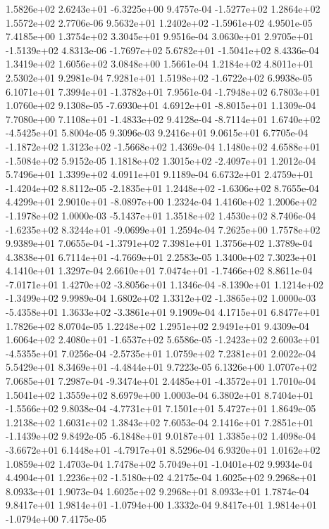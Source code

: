  1.5826e+02  2.6243e+01 -6.3225e+00  9.4757e-04
-1.5277e+02  1.2864e+02  1.5572e+02  2.7706e-06
 9.5632e+01  1.2402e+02 -1.5961e+02  4.9501e-05
7.4185e+00 1.3754e+02 3.3045e+01  9.9516e-04
 3.0630e+01  2.9705e+01 -1.5139e+02  4.8313e-06
-1.7697e+02  5.6782e+01 -1.5041e+02  8.4336e-04
1.3419e+02 1.6056e+02 3.0848e+00  1.5661e-04
1.2184e+02 4.8011e+01 2.5302e+01  9.2981e-04
 7.9281e+01  1.5198e+02 -1.6722e+02  6.9938e-05
 6.1071e+01  7.3994e+01 -1.3782e+01  7.9561e-04
-1.7948e+02  6.7803e+01  1.0760e+02  9.1308e-05
-7.6930e+01  4.6912e+01 -8.8015e+01  1.1309e-04
 7.7080e+00  7.1108e+01 -1.4833e+02  9.4128e-04
-8.7114e+01  1.6740e+02 -4.5425e+01  5.8004e-05
9.3096e-03 9.2416e+01 9.0615e+01  6.7705e-04
-1.1872e+02  1.3123e+02 -1.5668e+02  1.4369e-04
 1.1480e+02  4.6588e+01 -1.5084e+02  5.9152e-05
 1.1818e+02  1.3015e+02 -2.4097e+01  1.2012e-04
5.7496e+01 1.3399e+02 4.0911e+01  9.1189e-04
 6.6732e+01  2.4759e+01 -1.4204e+02  8.8112e-05
-2.1835e+01  1.2448e+02 -1.6306e+02  8.7655e-04
 4.4299e+01  2.9010e+01 -8.0897e+00  1.2324e-04
 1.4160e+02  1.2006e+02 -1.1978e+02  1.0000e-03
-5.1437e+01  1.3518e+02  1.4530e+02  8.7406e-04
-1.6235e+02  8.3244e+01 -9.0699e+01  1.2594e-04
7.2625e+00 1.7578e+02 9.9389e+01  7.0655e-04
-1.3791e+02  7.3981e+01  1.3756e+02  1.3789e-04
 4.3838e+01  6.7114e+01 -4.7669e+01  2.2583e-05
1.3400e+02 7.3023e+01 4.1410e+01  1.3297e-04
 2.6610e+01  7.0474e+01 -1.7466e+02  8.8611e-04
-7.0171e+01  1.4270e+02 -3.8056e+01  1.1346e-04
-8.1390e+01  1.1214e+02 -1.3499e+02  9.9989e-04
 1.6802e+02  1.3312e+02 -1.3865e+02  1.0000e-03
-5.4358e+01  1.3633e+02 -3.3861e+01  9.1909e-04
4.1715e+01 6.8477e+01 1.7826e+02  8.0704e-05
1.2248e+02 1.2951e+02 2.9491e+01  9.4309e-04
 1.6064e+02  2.4080e+01 -1.6537e+02  5.6586e-05
-1.2423e+02  2.6003e+01 -4.5355e+01  7.0256e-04
-2.5735e+01  1.0759e+02  7.2381e+01  2.0022e-04
 5.5429e+01  8.3469e+01 -4.4844e+01  9.7223e-05
6.1326e+00 1.0707e+02 7.0685e+01  7.2987e-04
-9.3474e+01  2.4485e+01 -4.3572e+01  1.7010e-04
1.5041e+02 1.3559e+02 8.6979e+00  1.0003e-04
 6.3802e+01  8.7404e+01 -1.5566e+02  9.8038e-04
-4.7731e+01  7.1501e+01  5.4727e+01  1.8649e-05
1.2138e+02 1.6031e+02 1.3843e+02  7.6053e-04
 2.1416e+01  7.2851e+01 -1.1439e+02  9.8492e-05
-6.1848e+01  9.0187e+01  1.3385e+02  1.4098e-04
-3.6672e+01  6.1448e+01 -4.7917e+01  8.5296e-04
6.9320e+01 1.0162e+02 1.0859e+02  1.4703e-04
 1.7478e+02  5.7049e+01 -1.0401e+02  9.9934e-04
 4.4904e+01  1.2236e+02 -1.5180e+02  4.2175e-04
1.6025e+02 9.2968e+01 8.0933e+01  1.9073e-04
1.6025e+02 9.2968e+01 8.0933e+01  1.7874e-04
 9.8417e+01  1.9814e+01 -1.0794e+00  1.3332e-04
 9.8417e+01  1.9814e+01 -1.0794e+00  7.4175e-05
